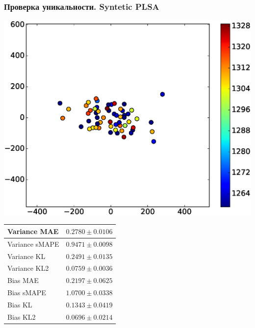 \documentclass[utf8]{beamer}
\begin{document}
	
	\begin{frame}
	\fontsize{8pt}{15.0}\selectfont
	\frametitle{Проверка уникальности. Syntetic PLSA}
	 \includegraphics[width=0.45\linewidth]{presentation_pictures/syntetic_plsa.eps} 
    \begin{tabular}[b]{| l | l | }\hline
      Variance MAE & $0.2780 \pm 0.0106$ \\ \hline
      Variance sMAPE  & $0.9471 \pm 0.0098$ \\ \hline
      Variance KL  & $0.2491 \pm 0.0135$ \\ \hline
      Variance KL2  & $0.0759 \pm 0.0036$ \\ \hline

      Bias MAE & $0.2197 \pm 0.0625$ \\ \hline
      Bias sMAPE  & $1.0700 \pm 0.0338$ \\ \hline
      Bias KL  & $0.1343 \pm 0.0419$ \\ \hline
      Bias KL2  & $0.0696 \pm 0.0214$ \\ \hline
    \end{tabular}

	\end{frame}
	
\end{document}
